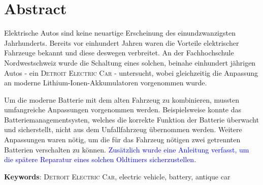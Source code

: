 \chapter*{Abstract}
Elektrische Autos sind keine neuartige Erscheinung des einundzwanzigsten Jahrhunderts. Bereits vor einhundert Jahren waren die Vorteile elektrischer Fahrzeuge bekannt und diese deswegen verbreitet. An der Fachhochschule Nordwestschweiz wurde die Schaltung eines solchen, beinahe einhundert jährigen Autos - ein \textsc{Detroit Electric Car} - untersucht, wobei gleichzeitig die Anpassung an moderne Lithium-Ionen-Akkumulatoren vorgenommen wurde.

Um die moderne Batterie mit dem alten Fahrzeug zu kombinieren, mussten umfangreiche Anpassungen vorgenommen werden. Beispielsweise konnte das Batteriemanagementsysten, welches die korrekte Funktion der Batterie überwacht und sicherstellt, nicht aus dem Unfallfahrzeug übernommen werden. Weitere Anpassungen waren nötig, um die für das Fahrzeug nötigen zwei getrennten Batterien verschalten zu können. \textcolor{blue}{Zusätzlich wurde eine Anleitung verfasst, um die spätere Reparatur eines solchen Oldtimers sicherzustellen.}

\textbf{Keywords}: \textsc{Detroit Electric Car}, electric vehicle, battery, antique car